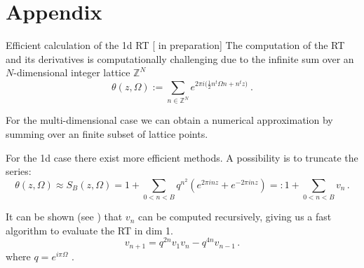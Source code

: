 \documentclass[10pt]{beamer}
\begin{document}
    
        


\section{Appendix }
\begin{frame}{Efficient calculation of the 1d RT \hfill \small [\cite{new} in preparation]}
    The computation of the RT and its derivatives is computationally challenging due to the infinite sum over 
    an $N$-dimensional integer lattice $\mathbb{Z}^N$
    \begin{equation*}
        \theta ( z, \Omega) :=
        \sum_{n \in \mathbb{Z}^N} e^{2 \pi i \big( \frac{1}{2}n^t \Omega n + n^t z \big)} \ .
    \end{equation*}

    For the multi-dimensional case we can obtain a numerical approximation by summing over an finite subset of lattice points.

    For the 1d case there exist more efficient methods.
    A possibility is to truncate the series:
    \begin{equation*}
        \theta ( z, \Omega) \approx S_B(z, \Omega) = 1 + \sum_{0 < n < B}  q^{n^2} (e^{2 \pi i n z} + e^{- 2 \pi i n z}) =: 
        1 + \sum_{0 < n < B} v_n \, .
    \end{equation*}


    It can be shown (see \cite{theta}) that $v_n$ can be computed recursively, giving us a fast algorithm to evaluate
    the RT in dim 1.
    \begin{equation}
            v_{n+1} = q^{ 2 n} v_1 v_n - q^{4 n} v_{n-1} \,. 
        \end{equation}
        where  $q = e^{i \pi \Omega}$ .
\end{frame}
\end{document}
